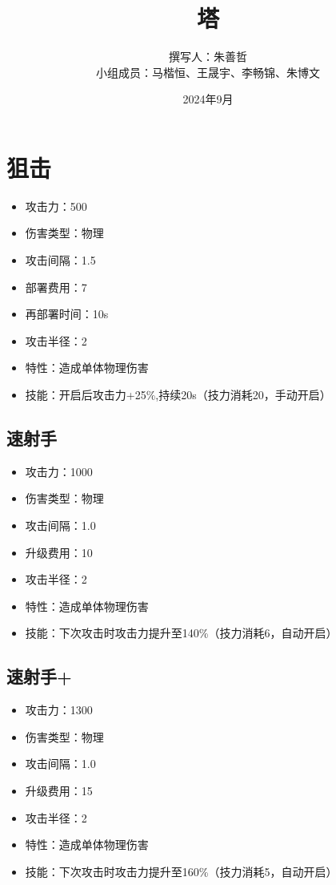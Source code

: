 \documentclass[a4paper,12pt]{article}
\begin{document}
	\title{塔}
	\author{撰写人：朱善哲\\小组成员：马楷恒、王晟宇、李畅锦、朱博文}
	\date{2024年9月}
	\maketitle
	\section{狙击}
		\begin{itemize}
			\item 攻击力：500
			\item 伤害类型：物理
			\item 攻击间隔：1.5
			\item 部署费用：7
			\item 再部署时间：10s
			\item 攻击半径：2
			\item 特性：造成单体物理伤害
			\item 技能：开启后攻击力+25\%,持续20s（技力消耗20，手动开启）
		\end{itemize}
		\subsection{速射手}
			\begin{itemize}
				\item 攻击力：1000
				\item 伤害类型：物理
				\item 攻击间隔：1.0
				\item 升级费用：10
				\item 攻击半径：2
				\item 特性：造成单体物理伤害
				\item 技能：下次攻击时攻击力提升至140\%（技力消耗6，自动开启）
			\end{itemize}
		\subsection{速射手+}
			\begin{itemize}
				\item 攻击力：1300
				\item 伤害类型：物理
				\item 攻击间隔：1.0
				\item 升级费用：15
				\item 攻击半径：2
				\item 特性：造成单体物理伤害
				\item 技能：下次攻击时攻击力提升至160\%（技力消耗5，自动开启）
			\end{itemize}
\end{document}
